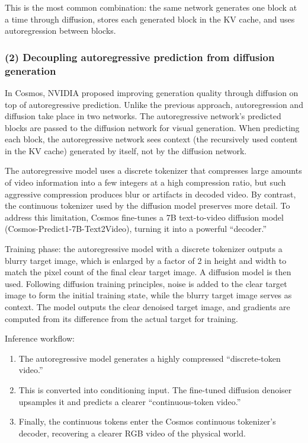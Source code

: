 This is the most common combination: the same network generates one block at a time through diffusion, stores each generated block in the KV cache, and uses autoregression between blocks.

\hypertarget{decoupling-autoregressive-prediction-from-diffusion-generation}{%
\subsubsection{(2) Decoupling autoregressive prediction from diffusion generation}\label{decoupling-autoregressive-prediction-from-diffusion-generation}}

In Cosmos, NVIDIA proposed improving generation quality through diffusion on top of autoregressive prediction. Unlike the previous approach, autoregression and diffusion take place in two networks. The autoregressive network's predicted blocks are passed to the diffusion network for visual generation. When predicting each block, the autoregressive network sees context (the recursively used content in the KV cache) generated by itself, not by the diffusion network.

The autoregressive model uses a discrete tokenizer that compresses large amounts of video information into a few integers at a high compression ratio, but such aggressive compression produces blur or artifacts in decoded video. By contrast, the continuous tokenizer used by the diffusion model preserves more detail. To address this limitation, Cosmos fine-tunes a 7B text-to-video diffusion model (Cosmos-Predict1-7B-Text2Video), turning it into a powerful ``decoder.''

Training phase: the autoregressive model with a discrete tokenizer outputs a blurry target image, which is enlarged by a factor of 2 in height and width to match the pixel count of the final clear target image. A diffusion model is then used. Following diffusion training principles, noise is added to the clear target image to form the initial training state, while the blurry target image serves as context. The model outputs the clear denoised target image, and gradients are computed from its difference from the actual target for training.

Inference workflow:

\begin{enumerate}
\def\labelenumi{\arabic{enumi}.}
\item
  The autoregressive model generates a highly compressed ``discrete-token video.''
\item
  This is converted into conditioning input. The fine-tuned diffusion denoiser upsamples it and predicts a clearer ``continuous-token video.''
\item
  Finally, the continuous tokens enter the Cosmos continuous tokenizer's decoder, recovering a clearer RGB video of the physical world.
\end{enumerate}

